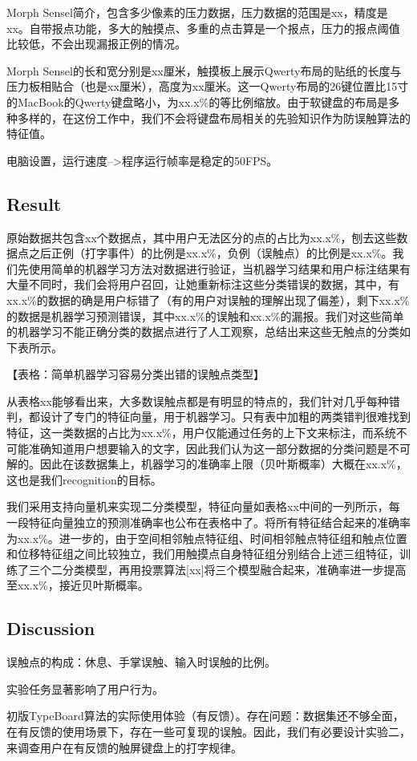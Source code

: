 Morph Sensel简介，包含多少像素的压力数据，压力数据的范围是xx，精度是xx。自带报点功能，多大的触摸点、多重的点击算是一个报点，压力的报点阈值比较低，不会出现漏报正例的情况。

Morph Sensel的长和宽分别是xx厘米，触摸板上展示Qwerty布局的贴纸的长度与压力板相贴合（也是xx厘米），高度为xx厘米。这一Qwerty布局的26键位置比15寸的MacBook的Qwerty键盘略小，为xx.x\%的等比例缩放。由于软键盘的布局是多种多样的，在这份工作中，我们不会将键盘布局相关的先验知识作为防误触算法的特征值。

电脑设置，运行速度-->程序运行帧率是稳定的50FPS。

\subsection{Result}

原始数据共包含xx个数据点，其中用户无法区分的点的占比为xx.x\%，刨去这些数据点之后正例（打字事件）的比例是xx.x\%，负例（误触点）的比例是xx.x\%。我们先使用简单的机器学习方法对数据进行验证，当机器学习结果和用户标注结果有大量不同时，我们会将用户召回，让她重新标注这些分类错误的数据，其中，有xx.x\%的数据的确是用户标错了（有的用户对误触的理解出现了偏差），剩下xx.x\%的数据是机器学习预测错误，其中xx.x\%的误触和xx.x\%的漏报。我们对这些简单的机器学习不能正确分类的数据点进行了人工观察，总结出来这些无触点的分类如下表所示。

【表格：简单机器学习容易分类出错的误触点类型】

从表格xx能够看出来，大多数误触点都是有明显的特点的，我们针对几乎每种错判，都设计了专门的特征向量，用于机器学习。只有表中加粗的两类错判很难找到特征，这一类数据的占比为xx.x\%，用户仅能通过任务的上下文来标注，而系统不可能准确知道用户想要输入的文字，因此我们认为这一部分数据的分类问题是不可解的。因此在该数据集上，机器学习的准确率上限（贝叶斯概率）大概在xx.x\%，这也是我们recognition的目标。

我们采用支持向量机来实现二分类模型，特征向量如表格xx中间的一列所示，每一段特征向量独立的预测准确率也公布在表格中了。将所有特征结合起来的准确率为xx.x\%。进一步的，由于空间相邻触点特征组、时间相邻触点特征组和触点位置和位移特征组之间比较独立，我们用触摸点自身特征组分别结合上述三组特征，训练了三个二分类模型，再用投票算法[xx]将三个模型融合起来，准确率进一步提高至xx.x\%，接近贝叶斯概率。

\subsection{Discussion}

误触点的构成：休息、手掌误触、输入时误触的比例。

实验任务显著影响了用户行为。

初版TypeBoard算法的实际使用体验（有反馈）。存在问题：数据集还不够全面，在有反馈的使用场景下，存在一些可复现的误触。因此，我们有必要设计实验二，来调查用户在有反馈的触屏键盘上的打字规律。
